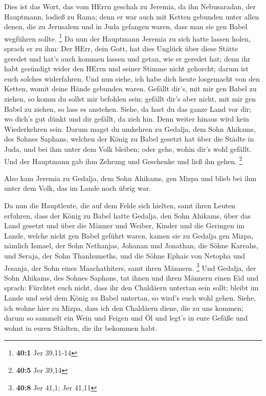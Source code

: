  Dies ist das Wort, das vom HErrn geschah zu Jeremia, da ihn
Nebusaradan, der Hauptmann, losließ zu Rama; denn er war auch mit Ketten
gebunden unter allen denen, die zu Jerusalem und in Juda gefangen waren,
dass man sie gen Babel wegführen sollte. \footnote{\textbf{40:1} Jer
  39,11-14}  Da nun der Hauptmann Jeremia zu sich hatte
lassen holen, sprach er zu ihm: Der HErr, dein Gott, hat dies Unglück
über diese Stätte geredet  und hat's auch kommen lassen und
getan, wie er geredet hat; denn ihr habt gesündigt wider den HErrn und
seiner Stimme nicht gehorcht; darum ist euch solches widerfahren.
 Und nun siehe, ich habe dich heute losgemacht von den
Ketten, womit deine Hände gebunden waren. Gefällt dir's, mit mir gen
Babel zu ziehen, so komm du sollst mir befohlen sein; gefällt dir's aber
nicht, mit mir gen Babel zu ziehen, so lass es anstehen. Siehe, da hast
du das ganze Land vor dir; wo dich's gut dünkt und dir gefällt, da zieh
hin.  Denn weiter hinaus wird kein Wiederkehren sein. Darum
magst du umkehren zu Gedalja, dem Sohn Ahikams, des Sohnes Saphans,
welchen der König zu Babel gesetzt hat über die Städte in Juda, und bei
ihm unter dem Volk bleiben; oder gehe, wohin dir's wohl gefällt. Und der
Hauptmann gab ihm Zehrung und Geschenke und ließ ihn gehen. \footnote{\textbf{40:5}
  Jer 39,14}

 Also kam Jeremia zu Gedalja, dem Sohn Ahikams, gen Mizpa
und blieb bei ihm unter dem Volk, das im Lande noch übrig war.

 Da nun die Hauptleute, die auf dem Felde sich hielten, samt
ihren Leuten erfuhren, dass der König zu Babel hatte Gedalja, den Sohn
Ahikams, über das Land gesetzt und über die Männer und Weiber, Kinder
und die Geringen im Lande, welche nicht gen Babel geführt waren,
 kamen sie zu Gedalja gen Mizpa, nämlich Ismael, der Sohn
Nethanjas, Johanan und Jonathan, die Söhne Kareahs, und Seraja, der Sohn
Thanhumeths, und die Söhne Ephais von Netopha und Jesanja, der Sohn
eines Maachathiters, samt ihren Männern. \footnote{\textbf{40:8} Jer
  41,1; Jer 41,11}  Und Gedalja, der Sohn Ahikams, des
Sohnes Saphans, tat ihnen und ihren Männern einen Eid und sprach:
Fürchtet euch nicht, dass ihr den Chaldäern untertan sein sollt; bleibt
im Lande und seid dem König zu Babel untertan, so wird's euch wohl
gehen.  Siehe, ich wohne hier zu Mizpa, dass ich den
Chaldäern diene, die zu uns kommen; darum so sammelt ein Wein und Feigen
und Öl und legt's in eure Gefäße und wohnt in euren Städten, die ihr
bekommen habt.

